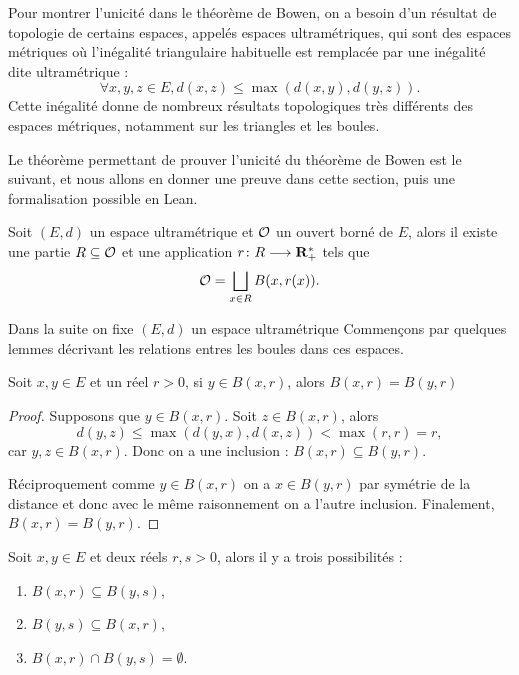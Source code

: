 \documentclass[../../rapport.tex]{subfiles}
\begin{document}
  Pour montrer l'unicité dans le théorème de Bowen, on a besoin d'un résultat de topologie de certains espaces,
  appelés espaces ultramétriques, qui sont des espaces métriques où l'inégalité triangulaire habituelle est remplacée
  par une inégalité dite ultramétrique :
  $$\forall x, y, z \in E, d(x, z) \le \max{(d(x, y), d(y, z))}.$$
  Cette inégalité donne de nombreux résultats topologiques très différents des espaces métriques,
  notamment sur les triangles et les boules.

  Le théorème permettant de prouver l'unicité du théorème de Bowen est le suivant,
  et nous allons en donner une preuve dans cette section,
  puis une formalisation possible en Lean.

  \begin{theorem}
    \label{thm:open_bdd_eq_disjoint_union_ball}
    Soit $(E, d)$ un espace ultramétrique et $\mathcal{O}$ un ouvert borné de $E$,
    alors il existe une partie $R \subseteq \mathcal{O}$ et une application $r \colon R \longrightarrow \mathbf R^*_+$ tels que
    $$\mathcal{O} = \bigsqcup_{x \in R}{B(x, r(x))}.$$
  \end{theorem}

  Dans la suite on fixe $(E, d)$ un espace ultramétrique
  Commençons par quelques lemmes décrivant les relations entres les boules dans ces espaces.

  \begin{lemma}
    \label{lem:ball_eq_of_mem}
    Soit $x, y \in E$ et un réel $r > 0$, si $y \in B(x, r)$, alors $B(x, r) = B(y, r)$
  \end{lemma}

  \begin{proof}
    Supposons que $y \in B(x, r)$. Soit $z \in B(x, r)$, alors
    $$d(y, z) \le \max{(d(y, x), d(x, z))} < \max{(r, r)} = r,$$
    car $y, z \in B(x, r)$. Donc on a une inclusion : $B(x, r) \subseteq B(y, r)$.

    Réciproquement comme $y \in B(x, r)$ on a $x \in B(y, r)$ par symétrie de la distance
    et donc avec le même raisonnement on a l'autre inclusion.
    Finalement, $B(x, r) = B(y, r)$.
  \end{proof}

  \begin{lemma}
    \label{lem:ball_subset_trichotomy}
    Soit $x, y \in E$ et deux réels $r, s > 0$, alors il y a trois possibilités :
    \begin{enumerate}
      \item $B(x, r) \subseteq B(y, s)$,
      \item $B(y, s) \subseteq B(x, r)$,
      \item $B(x, r) \cap B(y, s) = \emptyset$.
    \end{enumerate}
  \end{lemma}
\end{document}
